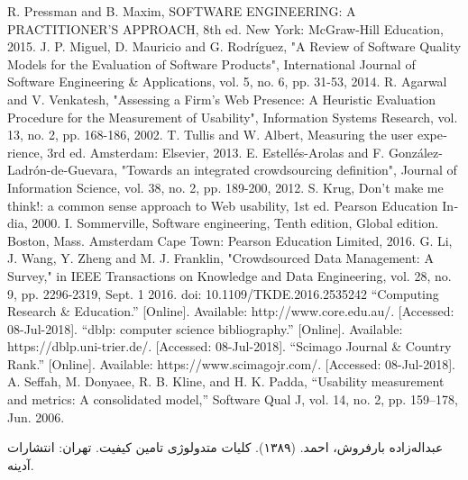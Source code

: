 \documentclass{article}
\theoremstyle{definition}
\begin{document}
\begin{thebibliography}{20}
	\begin{latin}
			R. Pressman and B. Maxim, SOFTWARE ENGINEERING: A PRACTITIONER’S APPROACH, 8th ed. New York: McGraw-Hill Education, 2015.
			J. P. Miguel, D. Mauricio and G. Rodríguez, "A Review of Software Quality Models for the Evaluation of Software Products", International Journal of Software Engineering \& Applications, vol. 5, no. 6, pp. 31-53, 2014.
			R. Agarwal and V. Venkatesh, "Assessing a Firm's Web Presence: A Heuristic Evaluation Procedure for the Measurement of Usability", Information Systems Research, vol. 13, no. 2, pp. 168-186, 2002.
			T. Tullis and W. Albert, Measuring the user experience, 3rd ed. Amsterdam: Elsevier, 2013.
			E. Estellés-Arolas and F. González-Ladrón-de-Guevara, "Towards an integrated crowdsourcing definition", Journal of Information Science, vol. 38, no. 2, pp. 189-200, 2012.
		S. Krug, Don’t make me think!: a common sense approach to Web usability, 1st ed. Pearson Education India, 2000.
		I. Sommerville, Software engineering, Tenth edition, Global edition. Boston, Mass. Amsterdam Cape Town: Pearson Education Limited, 2016.
		G. Li, J. Wang, Y. Zheng and M. J. Franklin, "Crowdsourced Data Management: A Survey," in IEEE Transactions on Knowledge and Data Engineering, vol. 28, no. 9, pp. 2296-2319, Sept. 1 2016.
		doi: 10.1109/TKDE.2016.2535242
		“Computing Research \& Education.” [Online]. Available: http://www.core.edu.au/. [Accessed: 08-Jul-2018].
		“dblp: computer science bibliography.” [Online]. Available: https://dblp.uni-trier.de/. [Accessed: 08-Jul-2018].
		“Scimago Journal \& Country Rank.” [Online]. Available: https://www.scimagojr.com/. [Accessed: 08-Jul-2018].
		A. Seffah, M. Donyaee, R. B. Kline, and H. K. Padda, “Usability measurement and metrics: A consolidated model,” Software Qual J, vol. 14, no. 2, pp. 159–178, Jun. 2006.
		
	\end{latin}
	عبداله‌زاده بارفروش، احمد. (۱۳۸۹). کلیات متدولوژی تامین کیفیت. تهران: انتشارات آدینه.
\end{thebibliography}
\end{document}
